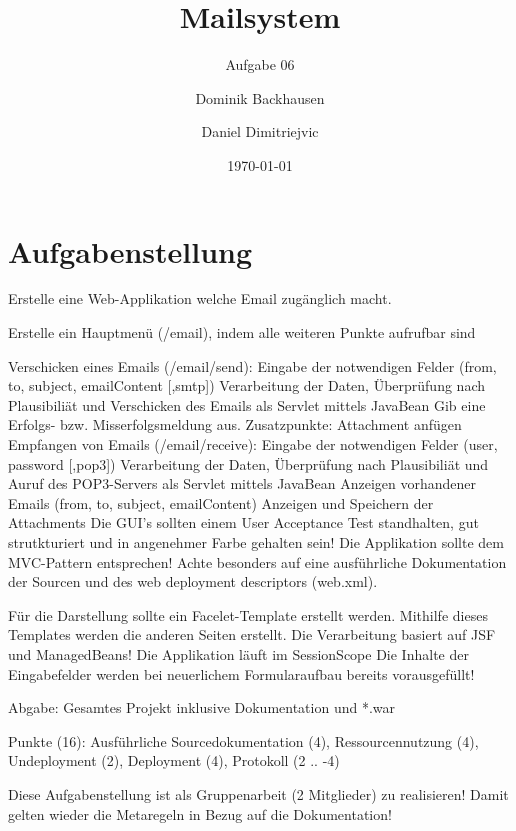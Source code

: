 \documentclass[a4paper,12pt]{scrreprt}
\begin{document}
\author{Dominik Backhausen \and Daniel Dimitriejvic} %
\title{  Mailsystem } %
\subject{APR} %
\subtitle{Aufgabe 06 } %
\date{\today} %
\publishers{5AHITT} %

\maketitle
\tableofcontents


\chapter{Aufgabenstellung}
Erstelle eine Web-Applikation welche Email zugänglich macht.

    Erstelle ein Hauptmenü (/email), indem alle weiteren Punkte aufrufbar sind

    Verschicken eines Emails (/email/send):
        Eingabe der notwendigen Felder (from, to, subject, emailContent [,smtp])
        Verarbeitung der Daten, Überprüfung nach Plausibiliät und Verschicken des Emails als Servlet mittels JavaBean
        Gib eine Erfolgs- bzw. Misserfolgsmeldung aus.
        Zusatzpunkte: Attachment anfügen
    Empfangen von Emails (/email/receive):
        Eingabe der notwendigen Felder (user, password [,pop3])
        Verarbeitung der Daten, Überprüfung nach Plausibiliät und Auruf des POP3-Servers als Servlet mittels JavaBean
        Anzeigen vorhandener Emails (from, to, subject, emailContent)
        Anzeigen und Speichern der Attachments
    Die GUI's sollten einem User Acceptance Test standhalten, gut strutkturiert und in angenehmer Farbe gehalten sein!
    Die Applikation sollte dem MVC-Pattern entsprechen!
    Achte besonders auf eine ausführliche Dokumentation der Sourcen und des web deployment descriptors (web.xml).

Für die Darstellung sollte ein Facelet-Template erstellt werden.
Mithilfe dieses Templates werden die anderen Seiten erstellt. Die Verarbeitung basiert auf JSF und ManagedBeans!
    Die Applikation läuft im SessionScope
        Die Inhalte der Eingabefelder werden bei neuerlichem Formularaufbau bereits vorausgefüllt!

Abgabe:
    Gesamtes Projekt inklusive Dokumentation und *.war


Punkte (16):
Ausführliche Sourcedokumentation (4), Ressourcennutzung (4), Undeployment (2), Deployment (4), Protokoll (2 .. -4)

Diese Aufgabenstellung ist als Gruppenarbeit (2 Mitglieder) zu realisieren! Damit gelten wieder die Metaregeln in Bezug auf die Dokumentation!
\end{document}
